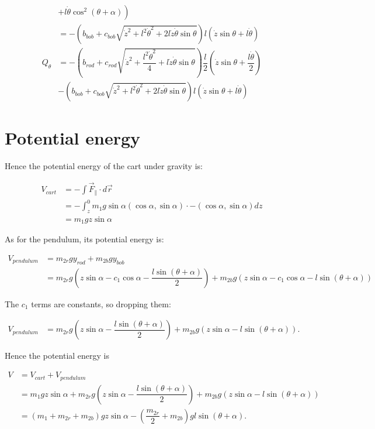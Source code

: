 \documentclass[12pt,a4paper,portrait]{article}
\begin{document}
\begin{align*}
		&\left.+ l\dot{\theta}\cos^2{(\theta+\alpha)}\right)\\
		&= -\left(b_{bob} + c_{bob}\sqrt{\dot{z}^2+l^2\dot{\theta}^2+2l\dot{z}\dot{\theta}\sin{\theta}}\right)l(\dot{z}\sin{\theta}+l\dot{\theta})\\
		Q_{\theta} &= -\left(b_{rod} + c_{rod}\sqrt{\dot{z}^2+\dfrac{l^2\dot{\theta}^2}{4}+l\dot{z}\dot{\theta}\sin{\theta}}\right)\dfrac{l}{2}\left(\dot{z}\sin{\theta}+\dfrac{l\dot{\theta}}{2}\right) \\
		&-\left(b_{bob} + c_{bob}\sqrt{\dot{z}^2+l^2\dot{\theta}^2+2l\dot{z}\dot{\theta}\sin{\theta}}\right)l(\dot{z}\sin{\theta}+l\dot{\theta})
	\end{align*}
	
	\section{Potential energy}
	Hence the potential energy of the cart under gravity is: 
	
	\begin{align*}
		V_{cart} &=-\int \vec{F}_{\parallel} \cdot d\vec{r} \\
		&= -\int_z^0 m_1g\sin{\alpha}(\cos{\alpha}, \sin{\alpha}) \cdot -(\cos{\alpha}, \sin{\alpha}) dz \\
		&= m_1gz\sin{\alpha}
	\end{align*}
	
	As for the pendulum, its potential energy is:
	
	\begin{align*}
		V_{pendulum} &= m_{2r} gy_{rod} + m_{2b}gy_{bob} \\
		&= m_{2r}g\left(z\sin{\alpha} - c_1\cos{\alpha} - \dfrac{l\sin{(\theta+\alpha)}}{2}\right) + m_{2b}g\left(z\sin{\alpha} - c_1\cos{\alpha} -l\sin{(\theta+\alpha)}\right)
	\end{align*}
	
	The $c_1$ terms are constants, so dropping them:
	
	\begin{align*}
		V_{pendulum} &= m_{2r}g\left(z\sin{\alpha} - \dfrac{l\sin{(\theta+\alpha)}}{2}\right) + m_{2b}g\left(z\sin{\alpha} - l\sin{(\theta+\alpha)}\right).
	\end{align*}
	
	Hence the potential energy is
	
	\begin{align*}
		V &= V_{cart} + V_{pendulum} \\
		&= m_1gz\sin{\alpha} + m_{2r}g\left(z\sin{\alpha}- \dfrac{l\sin{(\theta+\alpha)}}{2}\right) + m_{2b}g\left(z\sin{\alpha} - l\sin{(\theta+\alpha)}\right) \\
		&= (m_1+m_{2r}+m_{2b})gz\sin{\alpha} -\left(\dfrac{m_{2r}}{2}+m_{2b}\right)gl\sin{(\theta+\alpha)}.
	\end{align*}
	
\end{document}
